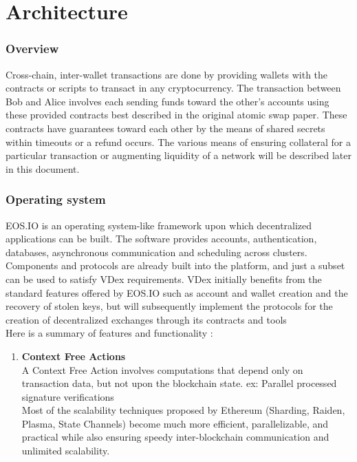 \documentclass[]{article}
\begin{document}
{									
\section{Architecture}
	
	\subsubsection{Overview}
	Cross-chain, inter-wallet transactions are done by providing wallets with the contracts or scripts to transact in any cryptocurrency. 
	The transaction between Bob and Alice involves each sending funds toward the other's accounts 
	using these provided contracts best described in the original atomic swap paper.\cite{22} 
	These contracts have guarantees toward each other by the means of shared secrets within timeouts or a refund occurs. 
	The various means of ensuring collateral for a particular transaction or augmenting liquidity of a network 
	will be described later in this document.
  
	\subsubsection{Operating system}
	
	EOS.IO is an operating system-like framework upon which decentralized applications can be built. 
	The software provides accounts, authentication, databases, asynchronous communication and scheduling across clusters. 
	Components and protocols are already built into the platform, and just a subset can be used to satisfy VDex requirements. 
	VDex initially benefits from the standard features offered by EOS.IO such as account and wallet creation 
	and the recovery of stolen keys, but will subsequently implement the protocols 
	for the creation of decentralized exchanges through its contracts and tools	\cite{3}\\
	Here is a summary of features and functionality :  

	\begin{enumerate}
					
			\item \textbf{Context Free Actions} \\
		A Context Free Action involves computations that depend only on transaction data, but not upon the blockchain state.
		ex: Parallel processed signature verifications\\
		Most of the scalability techniques proposed by Ethereum (Sharding, Raiden, Plasma, State Channels) 
		become much more efficient, parallelizable, and practical while also ensuring speedy inter-blockchain communication and unlimited scalability.
		

\end{enumerate}}
\end{document}
